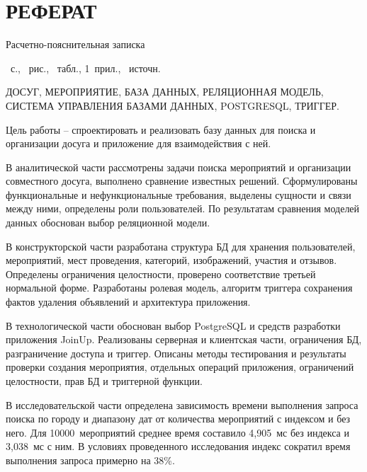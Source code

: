 \chapter*{РЕФЕРАТ}

Расчетно-пояснительная записка \begin{NoHyper}\pageref{LastPage}\end{NoHyper}~с., \totfig~рис., \tottab~табл., 1~прил., \mbox{\thetotbibentries~источн.}

ДОСУГ, МЕРОПРИЯТИЕ, БАЗА ДАННЫХ, РЕЛЯЦИОННАЯ МОДЕЛЬ, СИСТЕМА УПРАВЛЕНИЯ БАЗАМИ ДАННЫХ, POSTGRESQL, ТРИГГЕР.

Цель работы -- спроектировать и реализовать базу данных для поиска и организации досуга и приложение для взаимодействия с ней.

В аналитической части рассмотрены задачи поиска мероприятий и организации совместного досуга, выполнено сравнение известных решений. Сформулированы функциональные и нефункциональные требования, выделены сущности и связи между ними, определены роли пользователей. По результатам сравнения моделей данных обоснован выбор реляционной модели.

В конструкторской части разработана структура БД для хранения пользователей, мероприятий, мест проведения, категорий, изображений, участия и отзывов. Определены ограничения целостности, проверено соответствие третьей нормальной форме. Разработаны ролевая модель, алгоритм триггера сохранения фактов удаления объявлений и архитектура приложения.

В технологической части обоснован выбор PostgreSQL и средств разработки приложения JoinUp. Реализованы серверная и клиентская части, ограничения БД, разграничение доступа и триггер. Описаны методы тестирования и результаты проверки создания мероприятия, отдельных операций приложения, ограничений целостности, прав БД и триггерной функции.

В исследовательской части определена зависимость времени выполнения запроса поиска по городу и диапазону дат от количества мероприятий с индексом и без него. Для 10000~мероприятий среднее время составило 4,905~мс без индекса и 3,038~мс с ним. В условиях проведенного исследования индекс сократил время выполнения запроса примерно на 38\%.

